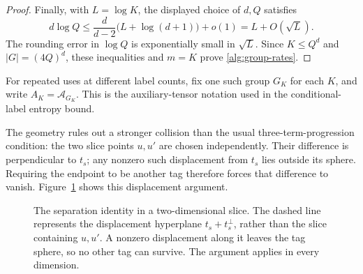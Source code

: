 \documentclass[11pt]{article}
\numberwithin{equation}{section}
\theoremstyle{definition}
\theoremstyle{remark}
\begin{document}
\begin{proof}
Finally, with \(L=\log K\), the displayed choice of \(d,Q\) satisfies
\[
 d\log Q
 \leq\frac{d}{d-2}\bigl(L+\log(d+1)\bigr)+o(1)
 =L+O(\sqrt L).
\]
The rounding error in \(\log Q\) is exponentially small in
\(\sqrt L\).  Since \(K\leq Q^d\) and
\(|G|=(4Q)^d\), these inequalities and \(m=K\) prove
\eqref{alg:group-rates}.
\end{proof}

For repeated uses at different label counts, fix one such group \(G_K\)
for each \(K\), and write \(A_K=\mathcal A_{G_K}\).  This is the
auxiliary-tensor notation used in the conditional-label entropy bound.

The geometry rules out a stronger collision than the usual
three-term-progression condition: the two slice points \(u,u'\) are chosen
independently.  Their difference is perpendicular to \(t_s\); any nonzero
such displacement from \(t_s\) lies outside its sphere.  Requiring the
endpoint to be another tag therefore forces that difference to vanish.
Figure~\ref{fig:group-geometry} shows this displacement argument.

\begin{figure}[H]
\centering
{}
\caption{The separation identity in a two-dimensional slice.
The dashed line represents the displacement hyperplane
\(t_s+t_s^\perp\), rather than the slice containing \(u,u'\).
A nonzero displacement along it leaves the tag sphere, so no other tag
can survive. The argument applies in every dimension.}
\label{fig:group-geometry}
\end{figure}
\end{document}
